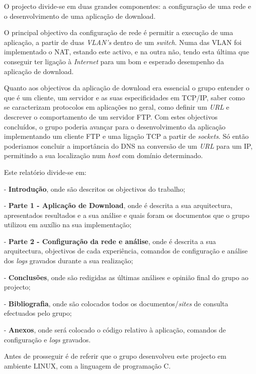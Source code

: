 \documentclass[a4paper]{article}
\begin{document}
O projecto divide-se em duas grandes componentes: a configuração de uma rede e o desenvolvimento de uma aplicação de download.\linebreak

O principal objectivo da configuração de rede é permitir a execução de uma aplicação, a partir de duas \textit{VLAN's} dentro de um \textit{switch}. Numa das VLAN foi implementado o NAT, estando este activo, e na outra não, tendo esta última que conseguir ter ligação à \textit{Internet} para um bom e esperado desempenho da aplicação de download.

Quanto aos objectivos da aplicação de download era essencial o grupo entender o que é um cliente, um servidor e as suas especificidades em TCP/IP, saber como se caracterizam protocolos em aplicações no geral, como definir um \textit{URL} e descrever o comportamento de um servidor FTP. Com estes objectivos concluídos, o grupo poderia avançar para o desenvolvimento da aplicação implementando um cliente FTP e uma ligação TCP a partir de \textit{sockets}. Só então poderiamos concluir a importância do DNS na conversão de um \textit{URL} para um IP, permitindo a sua localização num \textit{host} com domínio determinado.\linebreak

Este relatório divide-se em:

- \textbf{Introdução}, onde são descritos os objectivos do trabalho;

- \textbf{Parte 1 - Aplicação de Download}, onde é descrita a sua arquitectura, apresentados resultados e a sua análise e quais foram os documentos que o grupo utilizou em auxílio na sua implementação;

- \textbf{Parte 2 - Configuração da rede e análise}, onde é descrita a sua arquitectura, objectivos de cada experiência, comandos de configuração e análise dos \textit{logs} gravados durante a sua realização;

- \textbf{Conclusões}, onde são redigidas as últimas análises e opinião final do grupo ao projecto;

- \textbf{Bibliografia}, onde são colocados todos os documentos/\textit{sites} de consulta efectuados pelo grupo;

- \textbf{Anexos}, onde será colocado o código relativo à aplicação, comandos de configuração e \textit{logs} gravados.\linebreak

Antes de prosseguir é de referir que o grupo desenvolveu este projecto em ambiente LINUX, com a linguagem de programação C.
\end{document}
